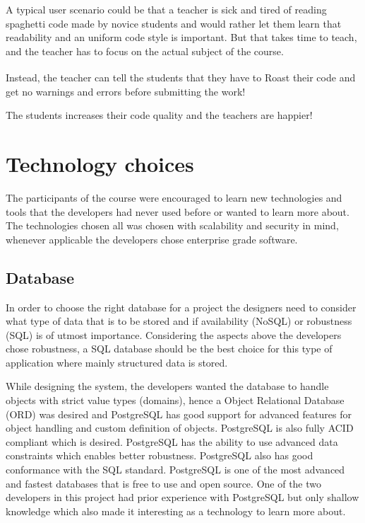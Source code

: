 \documentclass[12pt,a4paper]{report}
\begin{document}
A typical user scenario could be that a teacher is sick and tired of reading spaghetti code made by novice students and would rather let them learn that readability and an uniform code style is important. But that takes time to teach, and the teacher has to focus on the actual subject of the course.

Instead, the teacher can tell the students that they have to Roast\textsuperscript{\textregistered} their code and get no warnings and errors before submitting the work!

The students increases their code quality and the teachers are happier!

\chapter{Technology choices}
The participants of the course were encouraged to learn new technologies and tools that the developers had never used before or wanted to learn more about. The technologies chosen all was chosen with scalability and security in mind, whenever applicable the developers chose enterprise grade software.

\section{Database}
In order to choose the right database for a project the designers need to consider what type of data that is to be stored and if availability (NoSQL) or robustness (SQL) is of utmost importance.
Considering the aspects above the developers chose robustness, a SQL database should be the best choice for this type of application where mainly structured data is stored. 

While designing the system, the developers wanted the database to handle objects with strict value types (domains), hence a Object Relational Database (ORD) was desired and PostgreSQL has good support for advanced features for object handling and custom definition of objects. PostgreSQL is also fully ACID compliant\cite{pg-acid} which is desired. PostgreSQL has the ability to use advanced data constraints which enables better robustness. PostgreSQL also has good conformance with the SQL standard\cite{pg-sql-conformance}. PostgreSQL is one of the most advanced and fastest databases\cite{db-benchmark} that is free to use and open source.
One of the two developers in this project had prior experience with PostgreSQL but only shallow knowledge which also made it interesting as a technology to learn more about.
\end{document}

